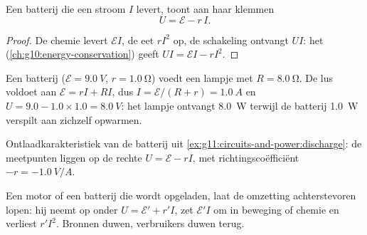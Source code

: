 \begin{proposition}[Klemspanning]\label{prop:g11:circuits-and-power:terminal}
Een batterij die een stroom $I$ levert, toont aan haar klemmen
\[ U = \mathcal{E} - r\,I . \]
\end{proposition}

\begin{proof}
De chemie levert $\mathcal{E}I$, de  eet $rI^2$ op,
de schakeling ontvangt $UI$: het 
(\cref{ch:g10:energy-conservation}) geeft $UI = \mathcal{E}I - rI^2$.
\end{proof}

\begin{example}\label{ex:g11:circuits-and-power:discharge}
Een batterij ($\mathcal{E} = \qty{9.0}{V}$, $r = \qty{1.0}{\ohm}$) voedt
een lampje met  $R = \qty{8.0}{\ohm}$. De lus voldoet aan
$\mathcal{E} = rI + RI$, dus $I = \mathcal{E}/(R + r) = \qty{1.0}{A}$ en
$U = 9.0 - 1.0 \times 1.0 = \qty{8.0}{V}$: het lampje ontvangt
\qty{8.0}{W} terwijl de batterij \qty{1.0}{W} verspilt aan zichzelf
opwarmen.
\end{example}

\begin{omfigure}

{\small Ontlaadkarakteristiek van de batterij uit
\cref{ex:g11:circuits-and-power:discharge}: de meetpunten liggen op de
rechte $U = \mathcal{E} - rI$, met richtingscoëfficiënt
$-r = \qty{-1.0}{V/A}$.}
\end{omfigure}

\begin{remark}[Verbruikers]\label{rem:g11:circuits-and-power:receivers}
Een motor of een batterij die wordt opgeladen, laat de omzetting
achterstevoren lopen: hij neemt op onder $U = \mathcal{E}' + r'I$, zet
$\mathcal{E}'I$ om in beweging of chemie en verliest $r'I^2$. Bronnen
duwen, verbruikers duwen terug.
\end{remark}

